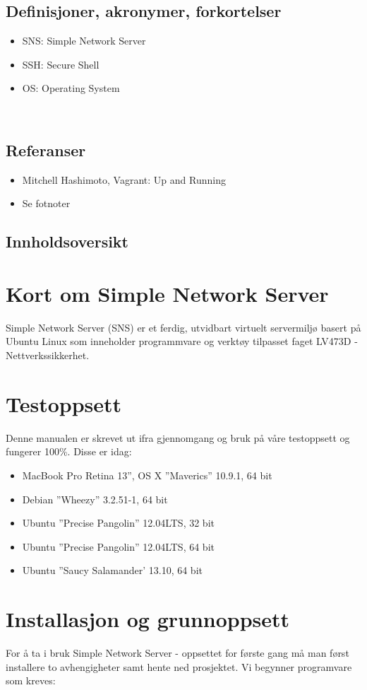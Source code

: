 \documentclass{article}
\begin{document}
\subsection{Definisjoner, akronymer, forkortelser}
\begin{itemize}
\item SNS: Simple Network Server
\item SSH: Secure Shell
\item OS: Operating System
\end{itemize}
\\
\subsection{Referanser}
\begin{itemize}
\item{Mitchell Hashimoto, Vagrant: Up and Running}
\item Se fotnoter
\end{itemize}
\subsection{Innholdsoversikt}
\section{Kort om Simple Network Server}
Simple Network Server (SNS) er et ferdig, utvidbart virtuelt servermiljø basert på Ubuntu Linux som inneholder programmvare og verktøy tilpasset faget LV473D -Nettverkssikkerhet. 
\section{Testoppsett}
Denne manualen er skrevet ut ifra gjennomgang og bruk på våre testoppsett og fungerer 100\%. Disse er idag: 
\begin{itemize}
\item MacBook Pro Retina 13'', OS X  ''Maverics'' 10.9.1, 64 bit
\item Debian ''Wheezy'' 3.2.51-1, 64 bit
\item Ubuntu ''Precise Pangolin'' 12.04LTS, 32 bit
\item Ubuntu ''Precise Pangolin'' 12.04LTS, 64 bit
\item Ubuntu ''Saucy Salamander' 13.10, 64 bit
\end{itemize}
\section{Installasjon og grunnoppsett}
For å ta i bruk Simple Network Server - oppsettet for første gang må man først installere to avhengigheter samt hente ned prosjektet. Vi begynner programvare som kreves:
\end{document}
